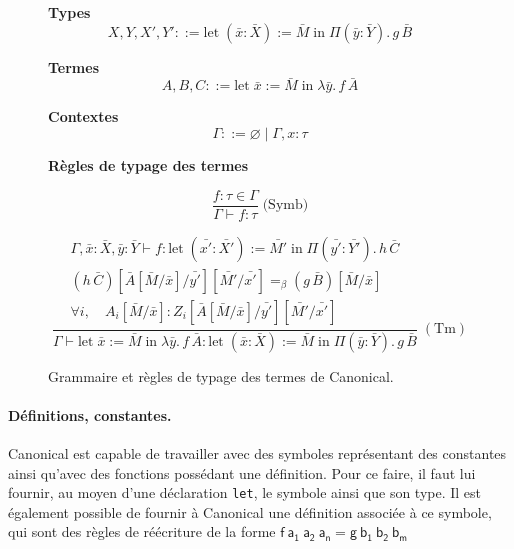 \documentclass[11pt]{article}
\begin{document}
\begin{figure}[h]
\centering
\begin{minipage}{0.42\textwidth}
\centering

\textbf{Types}
\[
X,Y,X',Y'
::= 
\mathrm{let}\;(\bar{x}:\bar{X}) := \bar{M}\;\mathrm{in}\;
\Pi(\bar{y}:\bar{Y}).\,g\,\bar{B}
\]

\vspace{0.5em}

\textbf{Termes}
\[
A,B,C
::=
\mathrm{let}\;\bar{x}:=\bar{M}\;\mathrm{in}\;
\lambda\bar{y}.\,f\,\bar{A}
\]

\vspace{0.5em}

\textbf{Contextes}
\[
\Gamma ::= \varnothing \mid \Gamma,x:\tau
\]

\end{minipage}
\hfill
\begin{minipage}{0.54\textwidth}
\centering

\textbf{Règles de typage des termes}


\[
\dfrac{f : \tau \in \Gamma}{\Gamma \vdash f : \tau} \; \text{(Symb)}
\]

\[
\frac{
\begin{array}{c}
\Gamma,\bar{x}:\bar{X},\bar{y}:\bar{Y}
\vdash
f :
\mathrm{let}\;(\bar{x'}:\bar{X'}) := \bar{M'}
\;\mathrm{in}\;
\Pi(\bar{y'}:\bar{Y'}).\,h\,\bar{C}
\\[0.8em]
(h\,\bar{C})
[\bar{A}[\bar{M}/\bar{x}]/\bar{y'}]
[\bar{M'}/\bar{x'}]
=_{\beta}
(g\,\bar{B})[\bar{M}/\bar{x}]
\\[0.8em]
\forall i,\quad
A_i[\bar{M}/\bar{x}]
:
Z_i[\bar{A}[\bar{M}/\bar{x}]/\bar{y'}]
[\bar{M'}/\bar{x'}]
\end{array}
}
{
\Gamma
\vdash
\mathrm{let}\;\bar{x}:=\bar{M}\;\mathrm{in}\;
\lambda\bar{y}.\,f\,\bar{A}
:
\mathrm{let}\;(\bar{x}:\bar{X}):=\bar{M}
\;\mathrm{in}\;
\Pi(\bar{y}:\bar{Y}).\,g\,\bar{B}
}
\;(\mathrm{Tm})
\]

\end{minipage}

\caption{Grammaire et règles de typage des termes de Canonical.}
\label{fig:canonical-tt}
\end{figure}

\paragraph{Définitions, constantes.} 
Canonical est capable de travailler avec des symboles représentant des constantes ainsi qu’avec des fonctions possédant une définition. 
Pour ce faire, il faut lui fournir, au moyen d’une déclaration \texttt{let}, le symbole ainsi que son type. 
Il est également possible de fournir à Canonical une définition associée à ce symbole, 
qui sont des règles de réécriture de la forme $\mathsf{f~a_1~a_2~a_n = g~b_1~b_2~b_m}$
\end{document}
